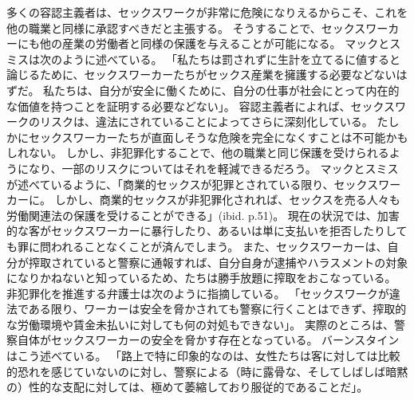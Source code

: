\documentclass[paper=a4,book,openany]{jlreq}
\newcommand{\ig}[1]{}           %
\begin{document}
多くの容認主義者は、セックスワークが非常に危険になりえるからこそ、これを他の職業と同様に承認すべきだと主張する。
そうすることで、セックスワーカーにも他の産業の労働者と同様の保護を与えることが可能になる。
マックとスミスは次のように述べている。
「私たちは罰されずに生計を立てるに値すると論じるために、セックスワーカーたちがセックス産業を擁護する必要などないはずだ。
私たちは、自分が安全に働くために、自分の仕事が社会にとって内在的な価値を持つことを証明する必要などない」\citep[p.55]{mac18:_revol_prost}。
容認主義者によれば、セックスワークのリスクは、違法にされていることによってさらに深刻化している。
たしかにセックスワーカーたちが直面しそうな危険を完全になくすことは不可能かもしれない。
しかし、非犯罪化することで、他の職業と同じ保護を受けられるようになり、一部のリスクについてはそれを軽減できるだろう。
マックとスミスが述べているように、「商業的セックスが犯罪とされている限り、セックスワーカーに。
しかし、商業的セックスが非犯罪化されれば、セックスを売る人々も労働関連法の保護を受けることができる」(ibid. p.51)。
現在の状況では、加害的な客がセックスワーカーに暴行したり、あるいは単に支払いを拒否したりしても罪に問われることなくことが済んでしまう。
また、セックスワーカーは、自分が搾取されていると警察に通報すれば、自分自身が逮捕やハラスメントの対象になりかねないと知っているため、たちは勝手放題に搾取をおこなっている。
非犯罪化を推進する弁護士は次のように指摘している。
「セックスワークが違法である限り、ワーカーは安全を脅かされても警察に行くことはできず、搾取的な労働環境や賃金未払いに対しても何の対処もできない」\citep{shugerman17:_prost_could_be_legal_calif}。
実際のところは、警察自体がセックスワーカーの安全を脅かす存在となっている。
バーンスタインはこう述べている。
「路上で特に印象的なのは、女性たちは客に対しては比較的恐れを感じていないのに対し、警察による（時に露骨な、そしてしばしば暗黙の）性的な支配に対しては、極めて萎縮しており服従的であることだ」\citep[p.108]{bernstein99:_whats_wrong_prost}。
\ig{Elizabeth Bernstein}
\end{document}
